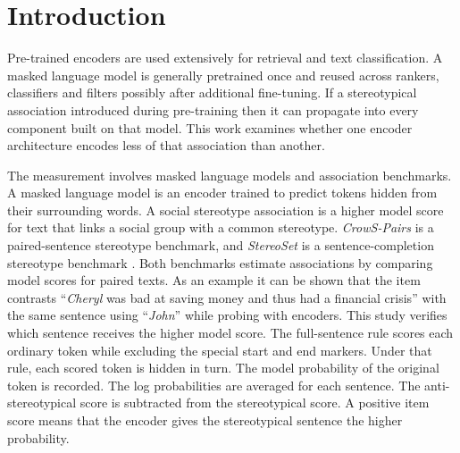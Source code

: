 \documentclass[sigconf,natbib=true,anonymous=true]{acmart}
\begin{document}


\maketitle

\section{Introduction}
\label{sec:intro-bundle}

Pre-trained encoders are used extensively for retrieval and text classification. A masked language model is generally pretrained once and reused across rankers, classifiers and filters possibly after additional fine-tuning. If a stereotypical association introduced during pre-training then it can propagate into every component built on that model. This work examines whether one encoder architecture encodes less of that association than another.

The measurement involves masked language models and association benchmarks. A masked language model is an encoder trained to predict tokens hidden from their surrounding words. A social stereotype association is a higher model score for text that links a social group with a common stereotype. \emph{CrowS-Pairs} is a paired-sentence stereotype benchmark, and \emph{StereoSet} is a sentence-completion stereotype benchmark \citep{nangia2020crows,nadeem2021stereoset}. Both benchmarks estimate associations by comparing model scores for paired texts. As an example it can be shown that the item contrasts ``\emph{Cheryl} was bad at saving money and thus had a financial crisis'' with the same sentence using ``\emph{John}'' while probing with encoders. This study verifies which sentence receives the higher model score. The full-sentence rule scores each ordinary token while excluding the special start and end markers. Under that rule, each scored token is hidden in turn. The model probability of the original token is recorded. The log probabilities are averaged for each sentence. The anti-stereotypical score is subtracted from the stereotypical score. A positive item score means that the encoder gives the stereotypical sentence the higher probability.
\end{document}
